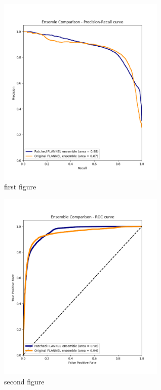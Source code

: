 \documentclass{sigkddExp}
\begin{document}
\begin{figure}
    \centering

    \includegraphics[width=8cm]{../doc/images/ensemble_comparison_precision_recall_curve.png}
    \caption{first figure}
    \label{fig:f2score}
\end{figure}

\begin{figure}
    \centering
    \includegraphics[width=8cm]{../doc/images/ensemble_comparison_roc_curve.png}
    \caption{second figure}
\end{figure}
\end{document}
